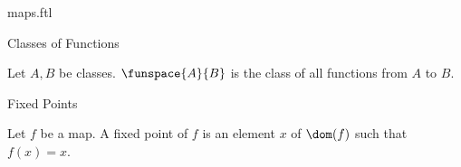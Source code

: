 \documentclass{naproche-library}
\begin{document}
\begin{smodule}[title=Maps]{maps.ftl}
\begin{sfragment}{Classes of Functions}
  \begin{definition}[forthel,id=FOUNDATIONS_06_5119110467813376]
    Let $A, B$ be classes.
    $\funspace{A}{B}$ is the class of all functions from $A$ to $B$.
  \end{definition}
\end{sfragment}

\begin{sfragment}{Fixed Points}
  \begin{definition}[forthel,id=FOUNDATIONS_06_2177076576649216]
    Let $f$ be a map.
    A fixed point of $f$ is an element $x$ of $\dom(f)$ such that $f(x) = x$.
  \end{definition}
\end{sfragment}
\end{smodule}
\end{document}
